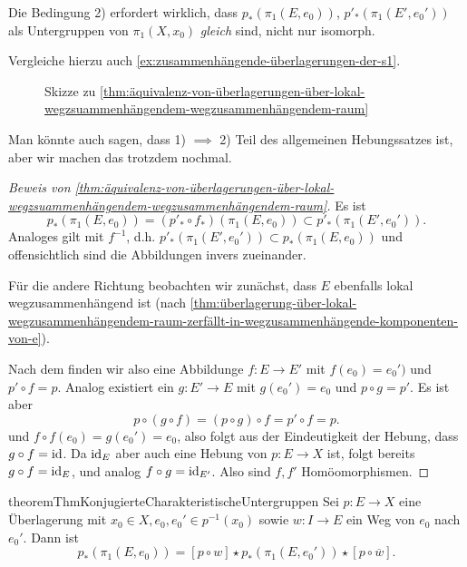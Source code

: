 \begin{warning}
    Die Bedingung 2) erfordert wirklich, dass $p_*(\pi_1(E,e_0))$, $p'_*(\pi_1(E',e_0'))$ als Untergruppen von $\pi_1(X,x_0)$ \textit{gleich} sind, nicht nur isomorph.

    Vergleiche hierzu auch \autoref{ex:zusammenhängende-überlagerungen-der-s1}. 
\end{warning}

\begin{figure}[ht]
    \centering
    \caption{Skizze zu \autoref{thm:äquivalenz-von-überlagerungen-über-lokal-wegzsuammenhängendem-wegzusammenhängendem-raum}}
    \label{fig:skizze-zur-äquivalenz-von-überlagerungen}
\end{figure}

\begin{oral}
    Man könnte auch sagen, dass 1) $\implies$ 2) Teil des allgemeinen Hebungssatzes ist, aber wir machen das trotzdem nochmal.
\end{oral}

\begin{proof}[Beweis von \autoref{thm:äquivalenz-von-überlagerungen-über-lokal-wegzsuammenhängendem-wegzusammenhängendem-raum}]
    Es ist 
    \[
        p_*(\pi_1(E,e_0)) = (p'_* \circ  f_*)(\pi_1(E,e_0)) \subset p'_*(\pi_1(E',e_0'))
    .\] 
    Analoges gilt mit $f^{-1}$, d.h. $p'_*(\pi_1(E',e_0'))\subset p_*(\pi_1(E,e_0))$ und offensichtlich sind die Abbildungen invers zueinander.

    Für die andere Richtung beobachten wir zunächst, dass $E$ ebenfalls lokal wegzusammenhängend ist (nach  \autoref{thm:überlagerung-über-lokal-wegzusammenhängendem-raum-zerfällt-in-wegzusammenhängende-komponenten-von-e}).

    Nach dem  finden wir also eine Abbildunge $f\colon  E \to  E'$ mit $f(e_0) = e_0')$ und $p' \circ  f = p$. Analog existiert ein $g\colon  E ' \to  E$ mit $g(e_0') = e_0$ und $ p \circ  g = p'$. Es ist aber
    \[
        p \circ (g \circ  f) = (p \circ  g) \circ  f = p' \circ  f = p
    .\] 
    und  $f\circ  f(e_0) = g(e_0' ) = e_0$, also folgt aus der Eindeutigkeit der Hebung, dass $g \circ f = \operatorname{id}$. Da $\operatorname{id}_E$ aber auch eine Hebung von  $p\colon  E \to X$ ist, folgt bereits $g \circ  f = \operatorname{id}_E$, und analog $f \circ  g = \operatorname{id}_{E'}$. Also sind $f,f'$ Homöomorphismen.
\end{proof}

\begin{restatable}{theorem}{ThmKonjugierteCharakteristischeUntergruppen}\label{thm:charakteristische-untergruppen-innerhalb-der-faser-sind-nur-konjugiert-wenn-weg-zwischen-urbildern-existiert}
    Sei $p\colon  E \to  X$ eine Überlagerung mit $x_0\in X, e_0,e_0' \in p^{-1} (x_0)$ sowie $w\colon  I \to  E$ ein Weg von $e_0$ nach $e_0'$. Dann ist
    \[
        p_*(\pi_1(E,e_0)) = [p \circ  w] \star p_*(\pi_1(E,e_0')) \star [p \circ  \overline{w}]
    .\] 
\end{restatable}


